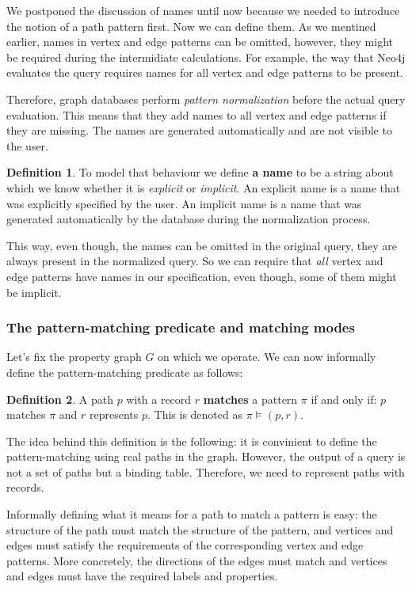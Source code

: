 \documentclass[14pt]{constructor-thesis}
\theoremstyle{definition}
\newtheorem{definition}{Definition}
\begin{document}
We postponed the discussion of names until now because we needed to introduce the notion of a path pattern first. Now we can define them. As we mentined earlier, names in vertex and edge patterns can be omitted, however, they might be required during the intermidiate calculations. For example, the way that Neo4j evaluates the query requires names for all vertex and edge patterns to be present. 

Therefore, graph databases perform \textit{pattern normalization} before the actual query evaluation. This means that they add names to all vertex and edge patterns if they are missing. The names are generated automatically and are not visible to the user.

\begin{definition}
  To model that behaviour we define \textbf{a name} to be a string about which we know whether it is \textit{explicit} or \textit{implicit}. An explicit name is a name that was explicitly specified by the user. An implicit name is a name that was generated automatically by the database during the normalization process.
\end{definition}

This way, even though, the names can be omitted in the original query, they are always present in the normalized query. So we can require that \textit{all} vertex and edge patterns have names in our specification, even though, some of them might be implicit.

\subsubsection{The pattern-matching predicate and matching modes}

Let's fix the property graph $G$ on which we operate. We can now informally define the pattern-matching predicate as follows:

\begin{definition}
   A path $p$ with a record $r$ \textbf{matches} a pattern $\pi$ if and only if: $p$ matches $\pi$ and $r$ represents $p$. This is denoted as $\pi \models (p, r)$.
\end{definition}

The idea behind this definition is the following: it is convinient to define the pattern-matching using real paths in the graph. However, the output of a query is not a set of paths but a binding table. Therefore, we need to represent paths with records.

Informally defining what it means for a path to match a pattern is easy: the structure of the path must match the structure of the pattern, and vertices and edges must satisfy the requirements of the corresponding vertex and edge patterns. More concretely, the directions of the edges must match and vertices and edges must have the required labels and properties.
\end{document}

